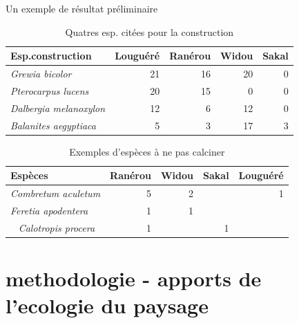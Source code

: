 \documentclass[newPxFont]{beamer}
\begin{document}
\begin{frame}[c]{Un exemple de résultat préliminaire}
\vspace{-1cm}
\begin{table}
  \begin{tabular}{lrrrr}
    \hline
    Esp.construction & Louguéré & Ranérou & Widou & Sakal \\
    \hline
    \textit{Grewia bicolor} & 21 & 16 & 20 & 0 \\
    \textit{Pterocarpus lucens} & 20 & 15 & 0 & 0 \\
    \textit{Dalbergia melanoxylon} & 12 & 6 &12 & 0 \\
    \textit{Balanites aegyptiaca} & 5 & 3 & 17 & 3 \\
    \hline
  \end{tabular}
  \caption{Quatres esp. citées pour la construction}
\end{table}
\begin{table}
  \begin{tabular}{lrrrr}
    \hline
    Espèces & Ranérou & Widou & Sakal & Louguéré \\
    \hline
    \textit{Combretum aculetum} & 5 & 2 & & 1\\
    \textit{Feretia apodentera} & 1 & 1 & &\\ 
    \textit{Calotropis procera} & 1 & & 1 &\\
    \hline
  \end{tabular}
  \caption{Exemples d'espèces à ne pas calciner}
\end{table}
\end{frame}

\section{methodologie - apports de l'ecologie du paysage}
\end{document}
